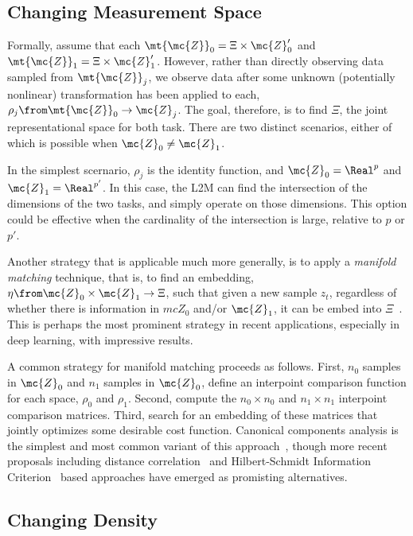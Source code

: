 \documentclass{article}
\begin{document}

\subsection{Changing Measurement Space}

Formally, assume that each $\mt{\mc{Z}}_0=\Xi \times \mc{Z}_0'$ and $\mt{\mc{Z}}_1 = \Xi \times \mc{Z}_1'$.  However, rather than directly observing data sampled from $\mt{\mc{Z}}_j$, we observe data after some unknown (potentially nonlinear) transformation has been applied to each, $\rho_j \from \mt{\mc{Z}}_0 \to \mc{Z}_j$. The goal, therefore, is to find $\Xi$, the joint representational space for both task.  There are two distinct scenarios, either of which is possible when $\mc{Z}_0 \neq \mc{Z}_1$. 

In the simplest scernario,  $\rho_j$ is the identity function, and $\mc{Z}_0 = \Real^p$ and $\mc{Z}_1 = \Real^{p'}$.  In this case, the L2M can find the intersection of the dimensions of the two tasks, and simply operate on those dimensions.  This option could be effective when the cardinality of the intersection is large, relative to $p$ or $p'$.  


Another strategy that is applicable much more generally,  is to apply a \emph{manifold matching} technique, that is, to find an embedding, $\eta \from \mc{Z}_0 \times \mc{Z}_1 \to \Xi$, such that given a new sample $z_t$, regardless of whether there is information in $mc{Z}_0$ and/or $\mc{Z}_1$, it can be embed into $\Xi$~\cite{manifold_matching}.  This is perhaps the most prominent strategy in recent applications, especially in deep learning, with impressive results.  

A common strategy for manifold matching proceeds as follows.  First, $n_0$ samples in $\mc{Z}_0$ and $n_1$ samples in $\mc{Z}_0$, define an interpoint comparison function for each space, $\rho_0$ and $\rho_1$.  Second, compute the $n_0 \times n_0$ and $n_1 \times n_1$ interpoint comparison matrices.  Third, search for an embedding of these matrices that jointly optimizes some desirable cost function.  Canonical components analysis is the simplest and most common variant of this approach~\cite{cca}, though more recent proposals including distance correlation~\cite{dcorrca} and Hilbert-Schmidt Information Criterion~\cite{hsic_ca} based approaches have emerged as promisting alternatives. 



\subsection{Changing Density}
\end{document}
